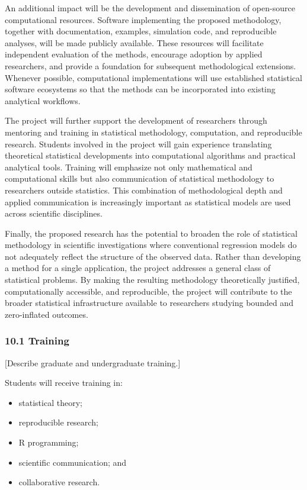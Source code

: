 \documentclass[
  11pt,
  letterpaper,
]{article}
\providecommand{\tightlist}{%
  \setlength{\itemsep}{0pt}\setlength{\parskip}{0pt}}\usepackage{longtable,booktabs,array}
\begin{document}
An additional impact will be the development and dissemination of
open-source computational resources. Software implementing the proposed
methodology, together with documentation, examples, simulation code, and
reproducible analyses, will be made publicly available. These resources
will facilitate independent evaluation of the methods, encourage
adoption by applied researchers, and provide a foundation for subsequent
methodological extensions. Whenever possible, computational
implementations will use established statistical software ecosystems so
that the methods can be incorporated into existing analytical workflows.

The project will further support the development of researchers through
mentoring and training in statistical methodology, computation, and
reproducible research. Students involved in the project will gain
experience translating theoretical statistical developments into
computational algorithms and practical analytical tools. Training will
emphasize not only mathematical and computational skills but also
communication of statistical methodology to researchers outside
statistics. This combination of methodological depth and applied
communication is increasingly important as statistical models are used
across scientific disciplines.

Finally, the proposed research has the potential to broaden the role of
statistical methodology in scientific investigations where conventional
regression models do not adequately reflect the structure of the
observed data. Rather than developing a method for a single application,
the project addresses a general class of statistical problems. By making
the resulting methodology theoretically justified, computationally
accessible, and reproducible, the project will contribute to the broader
statistical infrastructure available to researchers studying bounded and
zero-inflated outcomes.

\subsubsection{10.1 Training}\label{training}

{[}Describe graduate and undergraduate training.{]}

Students will receive training in:

\begin{itemize}
\tightlist
\item
  statistical theory;
\item
  reproducible research;
\item
  R programming;
\item
  scientific communication; and
\item
  collaborative research.
\end{itemize}
\end{document}
